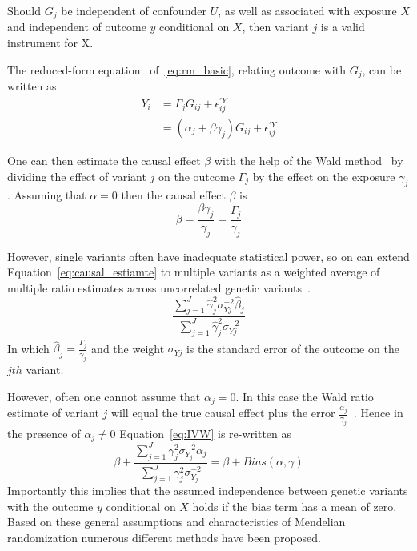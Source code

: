 Should $G_j$ be independent of confounder $U$,
as well as associated with exposure $X$ and independent of outcome $y$ conditional on $X$, then variant $j$ is a valid instrument for X.

The reduced-form equation~\cite{Bowden2015} of~\ref{eq:rm_basic}, relating outcome with $G_j$, can be written as
\begin{equation}
	\begin{split}
		Y_i &= \Gamma_j G_{ij} + \epsilon_{ij}^{'Y} \\
		&= (\alpha_j + \beta\gamma_j)G_{ij} + \epsilon_{ij}^{'Y}
	\end{split}
\end{equation}

One can then estimate the causal effect $\beta$ with the help of the Wald method~\cite{Wald1940}
by dividing the effect of variant $j$ on the outcome $\Gamma_j$ by the effect on the exposure $\gamma_j$.
Assuming that $\alpha=0$ then the causal effect $\beta$ is
\begin{equation} \label{eq:causal_estiamte}
	\beta = \frac{\beta\gamma_j}{\gamma_j}= \frac{\Gamma_j}{\gamma_j}
\end{equation}

However, single variants often have inadequate statistical power, so on can extend Equation~\ref{eq:causal_estiamte} to multiple variants as a weighted average of multiple ratio estimates across uncorrelated genetic variants~\cite{Bowden2015}.
\begin{equation} \label{eq:IVW}
  \frac{\sum^J_{j=1} \hat{\gamma}_j^2\sigma_{Yj}^{-2} \hat{\beta}_j}
  {\sum^J_{j=1} \hat{\gamma}_j^2\sigma_{Yj}^{-2}}
\end{equation}
In which $\hat{\beta}_j = \frac{\hat{\Gamma}_j}{\hat{\gamma}_j}$ and the weight $\sigma_{Yj}$ is the standard error of the outcome on the $jth$ variant.

However, often one cannot assume that $\alpha_j = 0$.
In this case the Wald ratio estimate of variant $j$ will equal the true causal effect plus the error $\frac{\alpha_j}{\gamma_j}$~\cite{Bowden2015}. 
Hence in the presence of $\alpha_j \neq 0$ Equation~\ref{eq:IVW} is re-written as
\begin{equation} \label{eq:TSLSbias}
  \beta + \frac{\sum^J_{j=1} \gamma_j^2\sigma_{Y_j}^{-2} \alpha_j}
  {\sum^J_{j=1} \gamma_j^2\sigma_{Y_j}^{-2}} = \beta + Bias(\alpha, \gamma)
\end{equation}
Importantly this implies that the assumed independence between genetic variants with the outcome $y$ conditional on $X$ holds if the bias term has a mean of zero.
Based on these general assumptions and characteristics of Mendelian randomization numerous different methods have been proposed.

